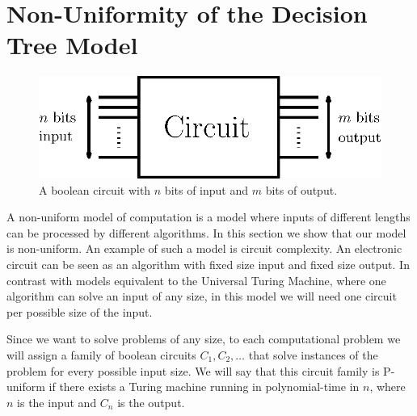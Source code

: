\section{Non-Uniformity of the Decision Tree Model}
\label{tree:sorting:nonuniformity}

\begin{figure}
\center
\includegraphics[height=0.2\textheight]{fig/sorting/model/circuit}
\caption{A boolean circuit with \(n\) bits of input and \(m\) bits of output.}
\label{fig:sorting:nonuniformity:circuit}
\end{figure}

A non-uniform model of computation is a model where inputs of different
lengths can be processed by different algorithms. In this section we show that
our model is non-uniform. An example of such a model is circuit complexity. An
electronic circuit can be seen as an algorithm with fixed size input and fixed
size output. In contrast with models equivalent to the Universal Turing
Machine, where one algorithm can solve an input of any size, in this model we
will need one circuit per possible size of the input.

Since we want to solve problems of any size, to each computational problem we
will assign a family of boolean circuits \(C_1,C_2,\ldots\) that solve
instances of the problem for every possible input size. We will say that this
circuit family is P-uniform if there exists a Turing machine running in
polynomial-time in \(n\), where \(n\) is the input and \(C_n\) is the output.

